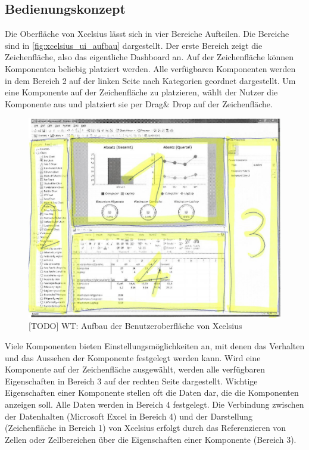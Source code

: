\begin{onehalfspacing}
\subsection{Bedienungskonzept}
Die Oberfläche von Xcelsius lässt sich in vier Bereiche Aufteilen. Die Bereiche sind in \vref{fig:xcelsius_ui_aufbau} dargestellt. Der erste Bereich zeigt die Zeichenfläche, also das eigentliche Dashboard an. Auf der Zeichenfläche können Komponenten beliebig platziert werden. Alle verfügbaren Komponenten werden in dem Bereich 2 auf der linken Seite nach Kategorien geordnet dargestellt. Um eine Komponente auf der Zeichenfläche zu platzieren, wählt der Nutzer die Komponente aus und platziert sie per Drag\& Drop auf der Zeichenfläche. 

\begin{figure}[h]
\centering
\setlength{\unitlength}{1mm}
\includegraphics[width=15cm]{images/Xcelsius_UI_Aufbau.jpg}
\caption{[TODO] WT: Aufbau der Benutzeroberfläche von Xcelsius\label{fig:xcelsius_ui_aufbau}}
\end{figure}

Viele Komponenten bieten Einstellungsmöglichkeiten an, mit denen das Verhalten und das Aussehen der Komponente festgelegt werden kann. Wird eine Komponente auf der Zeichenfläche ausgewählt, werden alle verfügbaren Eigenschaften in Bereich 3 auf der rechten Seite dargestellt. Wichtige Eigenschaften einer Komponente stellen oft die Daten dar, die die Komponenten anzeigen soll. Alle Daten werden in Bereich 4 festgelegt. Die Verbindung zwischen der Datenhalten (Microsoft Excel in Bereich 4) und der Darstellung (Zeichenfläche in Bereich 1) von Xcelsius erfolgt durch das Referenzieren von Zellen oder Zellbereichen über die Eigenschaften einer Komponente (Bereich 3).


\end{onehalfspacing}
